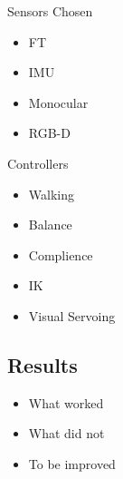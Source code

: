 Sensors Chosen
\begin{itemize}
\item FT
\item IMU
\item Monocular
\item RGB-D
\end{itemize}

Controllers
\begin{itemize}
\item Walking
\item Balance
\item Complience
\item IK
\item Visual Servoing
\end{itemize}

\subsection{Results}\label{sec:results}
\begin{itemize}
\item What worked
\item What did not
\item To be improved
\end{itemize}
